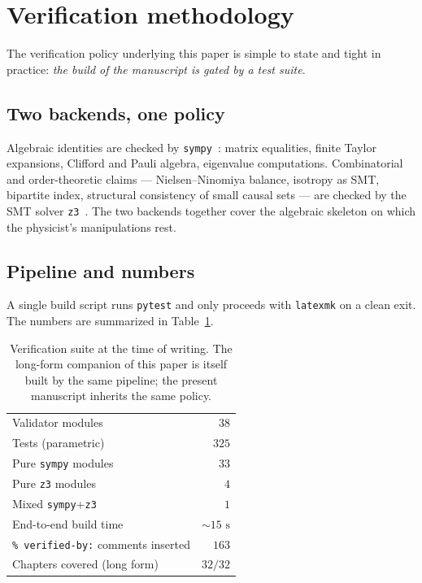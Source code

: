 \section{Verification methodology}
\label{p:verification}

The verification policy underlying this paper is simple to state and
tight in practice: \emph{the build of the manuscript is gated by a test
suite}.

\subsection{Two backends, one policy}
Algebraic identities are checked by \texttt{sympy}~\cite{Meurer2017}:
matrix equalities, finite Taylor expansions, Clifford and Pauli
algebra, eigenvalue computations. Combinatorial and order-theoretic
claims --- Nielsen--Ninomiya balance, isotropy as SMT, bipartite index,
structural consistency of small causal sets --- are checked by the SMT
solver \texttt{z3}~\cite{deMoura2008}. The two backends together cover
the algebraic skeleton on which the physicist's manipulations rest.

\subsection{Pipeline and numbers}
A single build script runs \texttt{pytest} and only proceeds with
\texttt{latexmk} on a clean exit. The numbers are summarized in
Table~\ref{p:tab:verification}.

\begin{table}[h]
\centering
\begin{tabular}{lr}
\toprule
Validator modules                & $38$ \\
Tests (parametric)               & $325$ \\
Pure \texttt{sympy} modules      & $33$ \\
Pure \texttt{z3} modules         & $4$ \\
Mixed \texttt{sympy}+\texttt{z3} & $1$ \\
End-to-end build time            & $\sim 15\text{ s}$ \\
\texttt{\% verified-by:} comments inserted & $163$ \\
Chapters covered (long form)     & $32/32$ \\
\bottomrule
\end{tabular}
\caption{Verification suite at the time of writing. The long-form
companion of this paper is itself built by the same pipeline; the
present manuscript inherits the same policy.}
\label{p:tab:verification}
\end{table}

